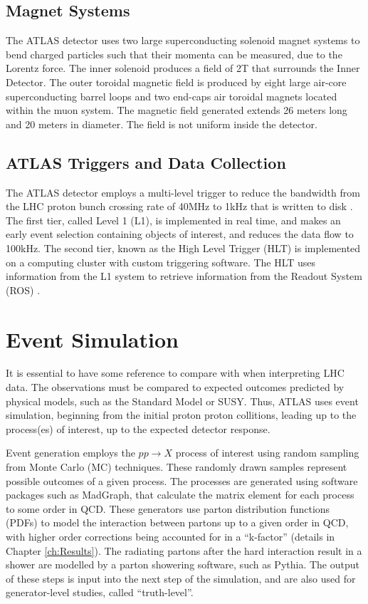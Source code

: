 \documentclass[11pt,a4paper,openright,twoside]{report}
\begin{document}
\subsection{Magnet Systems}
The ATLAS detector uses two large superconducting solenoid magnet systems to bend charged particles such that their momenta can be measured, due to the Lorentz force. The inner solenoid produces a field of 2T that surrounds the Inner Detector. The outer toroidal magnetic field is produced by eight large air-core superconducting barrel loops and two end-caps air toroidal magnets located within the muon system. The magnetic field generated extends 26 meters long and 20 meters in diameter. The field is not uniform inside the detector.

\subsection{ATLAS Triggers and Data Collection}
The ATLAS detector employs a multi-level trigger to reduce the bandwidth from the LHC proton bunch crossing rate of 40MHz to 1kHz that is written to disk \cite{trigger1,trigger2}. The first tier, called Level 1 (L1), is implemented in real time, and makes an early event selection containing objects of interest, and reduces the data flow to 100kHz. The second tier, known as the High Level Trigger (HLT) \cite{HLT} is implemented on a computing cluster with custom triggering software. The HLT uses information from the L1 system to retrieve information from the Readout System (ROS) \cite{ROS}.

\section{Event Simulation}
It is essential to have some reference to compare with when interpreting LHC data. The observations must be compared to expected outcomes predicted by physical models, such as the Standard Model or SUSY. Thus, ATLAS uses event simulation, beginning from the initial proton proton collitions, leading up to the process(es) of interest, up to the expected detector response.

Event generation employs the $pp\to X$ process of interest using random sampling from Monte Carlo (MC) techniques. These randomly drawn samples represent possible outcomes of a given process. The processes are generated using software packages such as MadGraph\cite{MadGraph}, that calculate the matrix element for each process to some order in QCD. These generators use parton distribution functions (PDFs) to model the interaction between partons up to a given order in QCD, with higher order corrections being accounted for in a ``k-factor'' (details in Chapter \ref{ch:Results}). The radiating partons after the hard interaction result in a shower are modelled by a parton showering software, such as Pythia\cite{pythia}. The output of these steps is input into the next step of the simulation, and are also used for generator-level studies, called ``truth-level''.
\end{document}
